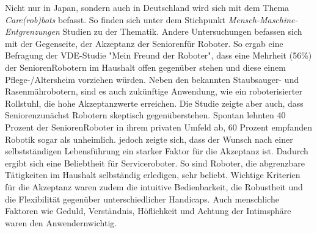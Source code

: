 Nicht nur in Japan, sondern auch in Deutschland wird sich mit dem Thema \textit{Care(rob)bots} befasst. So finden sich unter dem Stichpunkt \textit{Mensch-Maschine-Entgrenzungen} Studien zu der Thematik. Andere Untersuchungen befassen sich mit der Gegenseite, der Akzeptanz der Senioren\FemaleMale für Roboter. So ergab eine Befragung der VDE-Studie "Mein Freund der Roboter", dass eine Mehrheit (56\%) der Senioren\FemaleMale Robotern im Haushalt offen gegenüber stehen und diese einem Pflege-/Altersheim vorziehen würden. Neben den bekannten Staubsauger- und Rasenmährobotern, sind es auch zukünftige Anwendung, wie ein roboterisierter Rollstuhl, die hohe Akzeptanzwerte erreichen. Die Studie zeigte aber auch, dass Senioren\FemaleMale zunächst Robotern skeptisch gegenüberstehen. Spontan lehnten 40 Prozent der Senioren\FemaleMale Roboter in ihrem privaten Umfeld ab, 60 Prozent empfanden Robotik sogar als unheimlich. jedoch zeigte sich, dass der Wunsch nach einer selbstständigen Lebensführung ein starker Faktor für die Akzeptanz ist. Dadurch ergibt sich eine Beliebtheit für Serviceroboter. So sind Roboter, die abgrenzbare Tätigkeiten im Haushalt selbständig erledigen, sehr beliebt. Wichtige Kriterien für die Akzeptanz waren zudem die intuitive Bedienbarkeit, die Robustheit und die Flexibilität gegenüber unterschiedlicher Handicaps. Auch menschliche Faktoren wie Geduld, Verständnis, Höflichkeit und Achtung der Intimsphäre waren den Anwendern\FemaleMale wichtig.\citep{dr.sibyllemeyer2011}



